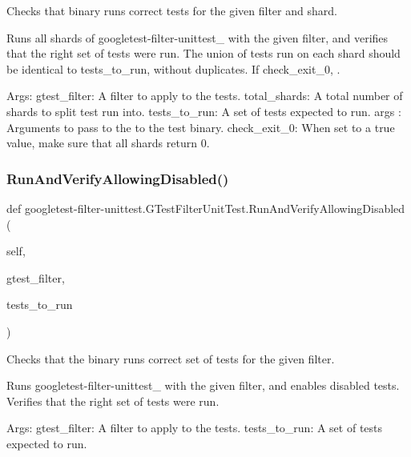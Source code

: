 \begin{DoxyVerb}Checks that binary runs correct tests for the given filter and shard.

Runs all shards of googletest-filter-unittest_ with the given filter, and
verifies that the right set of tests were run. The union of tests run
on each shard should be identical to tests_to_run, without duplicates.
If check_exit_0, .

Args:
  gtest_filter: A filter to apply to the tests.
  total_shards: A total number of shards to split test run into.
  tests_to_run: A set of tests expected to run.
  args   :      Arguments to pass to the to the test binary.
  check_exit_0: When set to a true value, make sure that all shards
            return 0.
\end{DoxyVerb}
 \mbox{\label{classgoogletest-filter-unittest_1_1_g_test_filter_unit_test_ad4202582f4fbc27a7e4ff9e751b1046f}} 
\subsubsection{\texorpdfstring{Run\+And\+Verify\+Allowing\+Disabled()}{RunAndVerifyAllowingDisabled()}}
{\footnotesize\ttfamily def googletest-\/filter-\/unittest.\+G\+Test\+Filter\+Unit\+Test.\+Run\+And\+Verify\+Allowing\+Disabled (\begin{DoxyParamCaption}\item[{}]{self,  }\item[{}]{gtest\+\_\+filter,  }\item[{}]{tests\+\_\+to\+\_\+run }\end{DoxyParamCaption})}

\begin{DoxyVerb}Checks that the binary runs correct set of tests for the given filter.

Runs googletest-filter-unittest_ with the given filter, and enables
disabled tests. Verifies that the right set of tests were run.

Args:
  gtest_filter: A filter to apply to the tests.
  tests_to_run: A set of tests expected to run.
\end{DoxyVerb}
 \mbox{\label{classgoogletest-filter-unittest_1_1_g_test_filter_unit_test_a5aedf9d24243167acee87c9ddba82cc7}} 
